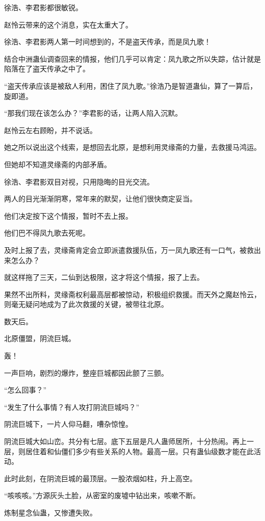 
\begin{this_body}

徐浩、李君影都很敏锐。

赵怜云带来的这个消息，实在太重大了。

徐浩、李君影两人第一时间想到的，不是盗天传承，而是凤九歌！

结合中洲蛊仙调查回来的情报，他们几乎可以肯定：凤九歌之所以失踪，估计就是陷落在了盗天传承之中了。

“盗天传承应该是被敌人利用，困住了凤九歌。”徐浩乃是智道蛊仙，算了一算后，旋即道。

“那我们现在该怎么办？”李君影的话，让两人陷入沉默。

赵怜云左右顾盼，并不说话。

她之所以说出这个线索，是想回去北原，是想利用灵缘斋的力量，去救援马鸿运。

但她却不知道灵缘斋的内部矛盾。

徐浩、李君影双目对视，只用隐晦的目光交流。

两人的目光渐渐阴寒，常年来的默契，让他们很快商定妥当。

他们决定按下这个情报，暂时不去上报。

他们巴不得凤九歌去死呢。

及时上报了去，灵缘斋肯定会立即派遣救援队伍，万一凤九歌还有一口气，被救出来怎么办？

就这样拖了三天，二仙到达极限，这才将这个情报，报了上去。

果然不出所料，灵缘斋权利最高层都被惊动，积极组织救援。而天外之魔赵怜云，则毫无疑问地成为了此次救援的关键，被带往北原。

数天后。

北原僵盟，阴流巨城。

轰！

一声巨响，剧烈的爆炸，整座巨城都因此颤了三颤。

“怎么回事？”

“发生了什么事情？有人攻打阴流巨城吗？”

阴流巨城下，一片人仰马翻，嘈杂惊惶。

阴流巨城大如山峦。共分有七层。底下五层是凡人蛊师居所，十分热闹。再上一层，则居住着和仙僵们多少有些关系的人物。最高一层。只有蛊仙级数才能在此活动。

此时此刻，在阴流巨城的最顶层。一股浓烟如柱，升上高空。

“咳咳咳。”方源灰头土脸，从密室的废墟中钻出来，咳嗽不断。

炼制星念仙蛊，又惨遭失败。


\end{this_body}

